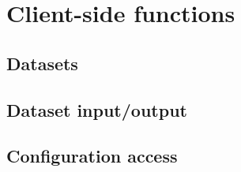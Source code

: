 \chapter{Client-side functions}
\label{chap:client}

\section{Datasets}
\label{sect:client_dataset}


\section{Dataset input/output}
\label{sect:client_inout}


\section{Configuration access}
\label{sect:client_config}
